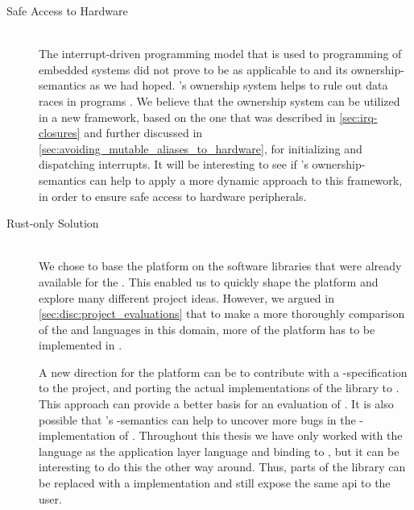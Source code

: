 \begin{description}
\item[Safe Access to Hardware] \hfill \\
  The interrupt-driven programming model that is used to programming of embedded systems did not prove to be as applicable to {\rust} and its ownership-semantics as we had hoped.
  {\rust}'s ownership system helps to rule out data races in programs \cite{web:rust_book}.
  We believe that the ownership system can be utilized in a new framework, based on the one that was described in \autoref{sec:irq-closures} and further discussed in \autoref{sec:avoiding_mutable_aliases_to_hardware}, for initializing and dispatching interrupts.
  It will be interesting to see if {\rust}'s ownership-semantics can help to apply a more dynamic approach to this framework, in order to ensure safe access to hardware peripherals.

\item[Rust-only Solution] \hfill \\
  We chose to base the {\rg} platform on the software libraries that were already available for the {\gecko}.
  This enabled us to quickly shape the platform and explore many different project ideas.
  However, we argued in \autoref{sec:disc:project_evaluations} that to make a more thoroughly comparison of the {\C} and {\rust} languages in this domain, more of the platform has to be implemented in {\rust}.

  A new direction for the platform can be to contribute with a {\gecko}-specification to the {\zinc} project, and porting the actual implementations of the {\emlib} library to {\rust}.
  This approach can provide a better basis for an evaluation of {\rust}.
  It is also possible that {\rust}'s -semantics can help to uncover more bugs in the {\C}-implementation of {\emlib}.
  Throughout this thesis we have only worked with the {\rust} language as the application layer language and binding to {\C}, but it can be interesting to do this the other way around.
  Thus, parts of the {\emlib} library can be replaced with a {\rust} implementation and still expose the same \gls{api} to the user.

\end{description}
